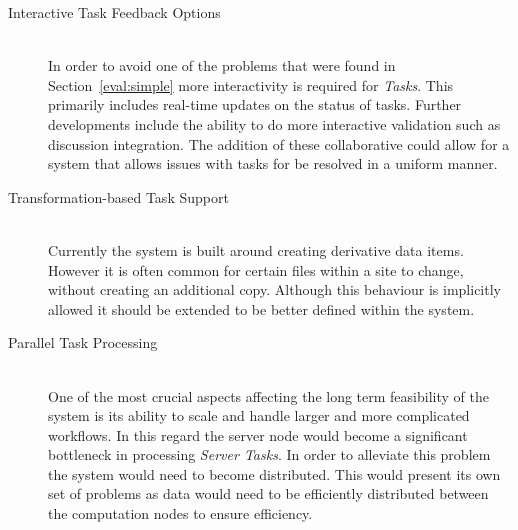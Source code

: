 \begin{description}
\item[Interactive Task Feedback Options]\hfill \\
In order to avoid one of the problems that were found in Section~\ref{eval:simple}
more interactivity is required for \emph{Tasks}. This primarily includes
real-time updates on the status of tasks. Further developments include the
ability to do more interactive validation such as discussion integration.
The addition of these collaborative could allow for a system that allows issues
with tasks for be resolved in a uniform manner\cite{guimaraes1998integration}.
\item[Transformation-based Task Support]\hfill \\
Currently the system is built around creating derivative data items. However it
is often common for certain files within a site to change, without creating an
additional copy. Although this behaviour is implicitly allowed it should be
extended to be better defined within the system.
\item[Parallel Task Processing] \hfill \\
One of the most crucial aspects affecting the long term feasibility of the
system is its ability to scale and handle larger and more complicated workflows.
In this regard the server node would become a significant bottleneck in
processing \emph{Server Tasks}. In order to alleviate this problem the system
would need to become distributed. This would present its own set of problems
as data would need to be efficiently distributed between the computation nodes
to ensure efficiency.

\end{description}

